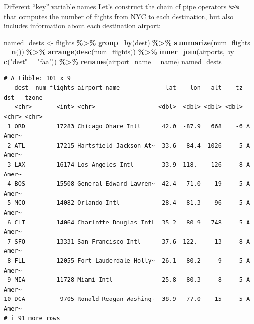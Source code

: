 \documentclass[
  ignorenonframetext,
]{beamer}
\newenvironment{Shaded}{\begin{snugshade}}{\end{snugshade}}
\newcommand{\AttributeTok}[1]{\textcolor[rgb]{0.13,0.29,0.53}{#1}}
\newcommand{\FunctionTok}[1]{\textcolor[rgb]{0.13,0.29,0.53}{\textbf{#1}}}
\newcommand{\NormalTok}[1]{#1}
\newcommand{\OtherTok}[1]{\textcolor[rgb]{0.56,0.35,0.01}{#1}}
\newcommand{\SpecialCharTok}[1]{\textcolor[rgb]{0.81,0.36,0.00}{\textbf{#1}}}
\newcommand{\StringTok}[1]{\textcolor[rgb]{0.31,0.60,0.02}{#1}}
\begin{document}
\begin{frame}[fragile]{Different ``key'' variable names}
\protect\hypertarget{different-key-variable-names-2}{}
Let's construct the chain of pipe operators \texttt{\%\textgreater{}\%}
that computes the number of flights from NYC to each destination, but
also includes information about each destination airport:

\tiny

\begin{Shaded}
\begin{Highlighting}[]
\NormalTok{named\_dests }\OtherTok{\textless{}{-}}\NormalTok{ flights }\SpecialCharTok{\%\textgreater{}\%}
  \FunctionTok{group\_by}\NormalTok{(dest) }\SpecialCharTok{\%\textgreater{}\%}
  \FunctionTok{summarize}\NormalTok{(}\AttributeTok{num\_flights =} \FunctionTok{n}\NormalTok{()) }\SpecialCharTok{\%\textgreater{}\%}
  \FunctionTok{arrange}\NormalTok{(}\FunctionTok{desc}\NormalTok{(num\_flights)) }\SpecialCharTok{\%\textgreater{}\%}
  \FunctionTok{inner\_join}\NormalTok{(airports, }\AttributeTok{by =} \FunctionTok{c}\NormalTok{(}\StringTok{"dest"} \OtherTok{=} \StringTok{"faa"}\NormalTok{)) }\SpecialCharTok{\%\textgreater{}\%}
  \FunctionTok{rename}\NormalTok{(}\AttributeTok{airport\_name =}\NormalTok{ name)}
\NormalTok{named\_dests}
\end{Highlighting}
\end{Shaded}

\begin{verbatim}
# A tibble: 101 x 9
   dest  num_flights airport_name             lat    lon   alt    tz dst   tzone
   <chr>       <int> <chr>                  <dbl>  <dbl> <dbl> <dbl> <chr> <chr>
 1 ORD         17283 Chicago Ohare Intl      42.0  -87.9   668    -6 A     Amer~
 2 ATL         17215 Hartsfield Jackson At~  33.6  -84.4  1026    -5 A     Amer~
 3 LAX         16174 Los Angeles Intl        33.9 -118.    126    -8 A     Amer~
 4 BOS         15508 General Edward Lawren~  42.4  -71.0    19    -5 A     Amer~
 5 MCO         14082 Orlando Intl            28.4  -81.3    96    -5 A     Amer~
 6 CLT         14064 Charlotte Douglas Intl  35.2  -80.9   748    -5 A     Amer~
 7 SFO         13331 San Francisco Intl      37.6 -122.     13    -8 A     Amer~
 8 FLL         12055 Fort Lauderdale Holly~  26.1  -80.2     9    -5 A     Amer~
 9 MIA         11728 Miami Intl              25.8  -80.3     8    -5 A     Amer~
10 DCA          9705 Ronald Reagan Washing~  38.9  -77.0    15    -5 A     Amer~
# i 91 more rows
\end{verbatim}

\normalsize
\end{frame}
\end{document}
